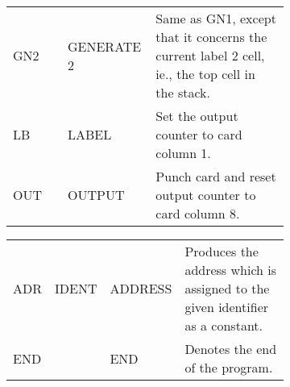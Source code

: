 \documentclass[notitlepage,twocolumn]{report}
\begin{document}
\begin{figure}[htb]
\begin{subfigure}[b]{\textwidth}
\begin{tabular}{lllp{7cm}}
      GN2 & & GENERATE 2 & Same as GN1, except that it concerns the
                           current label 2 cell, ie., the top cell in the
                           stack. \\
      LB & & LABEL & Set the output counter to card column 1. \\
      OUT & & OUTPUT & Punch card and reset output counter to card column
                       8. \\
    \end{tabular}
  \end{subfigure}
  \begin{subfigure}[b]{\textwidth}
    \begin{tabular}{lllp{7cm}}
      ADR & IDENT & ADDRESS & Produces the address which is assigned to
                              the given identifier as a constant. \\
      END & & END & Denotes the end of the program. \\
    \end{tabular}
  \end{subfigure}
\end{figure}
\end{document}
